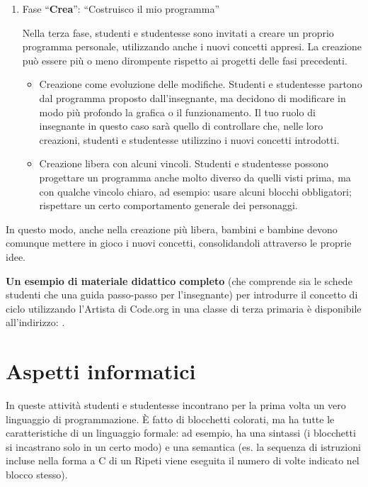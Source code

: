 \begin{enumerate}
In questa fase si lavora molto sulla curiosità e sulla sperimentazione, orientando sempre le attività di modifica a comprendere meglio i nuovi concetti da introdurre.


\item
  Fase ``\textbf{Crea}'': ``Costruisco il mio programma''


Nella terza fase, studenti e studentesse sono invitati a creare un proprio programma personale, utilizzando anche i nuovi concetti appresi. La creazione può essere più o meno dirompente rispetto ai progetti delle fasi precedenti.


\begin{itemize}
\item
  Creazione come evoluzione delle modifiche. Studenti e studentesse partono dal programma proposto dall'insegnante, ma decidono di modificare in modo più profondo la grafica o il funzionamento. Il tuo ruolo di insegnante in questo caso sarà quello di controllare che, nelle loro creazioni, studenti e studentesse utilizzino i nuovi concetti introdotti.
\item
  Creazione libera con alcuni vincoli. Studenti e studentesse possono progettare un programma anche molto diverso da quelli visti prima, ma con qualche vincolo chiaro, ad esempio: usare alcuni blocchi obbligatori; rispettare un certo comportamento generale dei personaggi.
\end{itemize}

\end{enumerate}

In questo modo, anche nella creazione più libera, bambini e bambine devono comunque mettere in gioco i nuovi concetti, consolidandoli attraverso le proprie idee.


\textbf{Un esempio di materiale didattico completo} (che comprende sia le schede studenti che una guida passo-passo per l'insegnante) per introdurre il concetto di ciclo utilizzando l'Artista di Code.org in una classe di terza primaria è disponibile all'indirizzo: .

\section{Aspetti informatici }\label{aspetti-informatici-3}

In queste attività studenti e studentesse incontrano per la prima volta un vero linguaggio di programmazione. È fatto di blocchetti colorati, ma ha tutte le caratteristiche di un linguaggio formale: ad esempio, ha una sintassi (i blocchetti si incastrano solo in un certo modo) e una semantica (es. la sequenza di istruzioni incluse nella forma a C di un Ripeti viene eseguita il numero di volte indicato nel blocco stesso).

